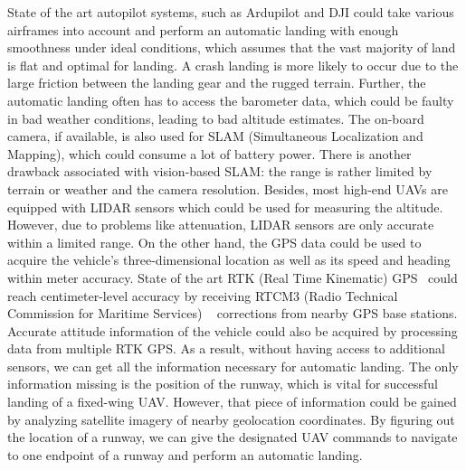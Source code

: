 \documentclass[10pt,twocolumn,letterpaper]{article}
\begin{document}
State of the art autopilot systems, such as Ardupilot and DJI could take various airframes into account and perform an automatic landing with enough smoothness under ideal conditions, which assumes that the vast majority of land is flat and optimal for landing. A crash landing is more likely to occur due to the large friction between the landing gear and the rugged terrain. Further, the automatic landing often has to access the barometer data, which could be faulty in bad weather conditions, leading to bad altitude estimates. The on-board camera, if available, is also used for SLAM (Simultaneous Localization and Mapping), which could consume a lot of battery power. There is another drawback associated with vision-based SLAM: the range is rather limited by terrain or weather and the camera resolution. Besides, most high-end UAVs are equipped with LIDAR sensors which could be used for measuring the altitude. However, due to problems like attenuation, LIDAR sensors are only accurate within a limited range. On the other hand, the GPS data could be used to acquire the vehicle’s three-dimensional location as well as its speed and heading within meter accuracy. State of the art RTK (Real Time Kinematic) GPS~\cite{Author1} could reach centimeter-level accuracy by receiving RTCM3 (Radio Technical Commission for Maritime Services) ~\cite{Author2} corrections from nearby GPS base stations. Accurate attitude information of the vehicle could also be acquired by processing data from multiple RTK GPS. As a result, without having access to additional sensors, we can get all the information necessary for automatic landing. The only information missing is the position of the runway, which is vital for successful landing of a fixed-wing UAV. However, that piece of information could be gained by analyzing satellite imagery of nearby geolocation coordinates. By figuring out the location of a runway, we can give the designated UAV commands to navigate to one endpoint of a runway and perform an automatic landing.
\end{document}
